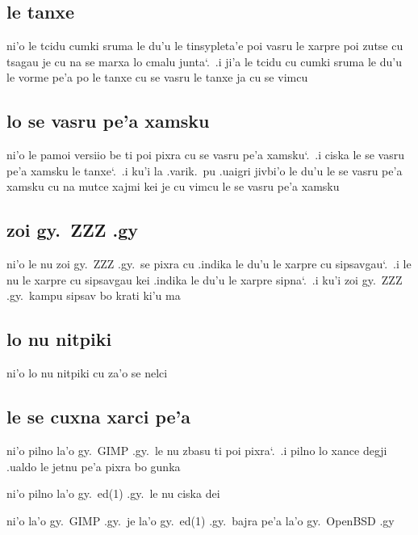 \documentclass{report}
\newcommand\sds{\spacefactor\sfcode`.\ \space}
\begin{document}
\subsection{le tanxe}
ni'o le tcidu cumki sruma le du'u le tinsypleta'e poi vasru le xarpre poi zutse cu tsagau je cu na se marxa lo cmalu junta\sds  .i ji'a le tcidu cu cumki sruma le du'u le vorme pe'a po le tanxe cu se vasru le tanxe ja cu se vimcu

\subsection{lo se vasru pe'a xamsku}
ni'o le pamoi versiio be ti poi pixra cu se vasru pe'a xamsku\sds  .i ciska le se vasru pe'a xamsku le tanxe\sds  .i ku'i la .varik.\ pu .uaigri jivbi'o le du'u le se vasru pe'a xamsku cu na mutce xajmi kei je cu vimcu le se vasru pe'a xamsku

\subsection{zoi gy.\ ZZZ .gy}
ni'o le nu zoi gy.\ ZZZ .gy.\ se pixra cu .indika le du'u le xarpre cu sipsavgau\sds  .i le nu le xarpre cu sipsavgau kei .indika le du'u le xarpre sipna\sds  .i ku'i zoi gy.\ ZZZ .gy.\ kampu sipsav bo krati ki'u ma

\subsection{lo nu nitpiki}
ni'o lo nu nitpiki cu za'o se nelci

\subsection{le se cuxna xarci pe'a}
ni'o pilno la'o gy.\ GIMP .gy.\ le nu zbasu ti poi pixra\sds  .i pilno lo xance degji .ualdo le jetnu pe'a pixra bo gunka

ni'o pilno la'o gy.\ ed(1) .gy.\ le nu ciska dei

ni'o la'o gy.\ GIMP .gy.\ je la'o gy.\ ed(1) .gy.\ bajra pe'a la'o gy.\ OpenBSD .gy
\end{document}
